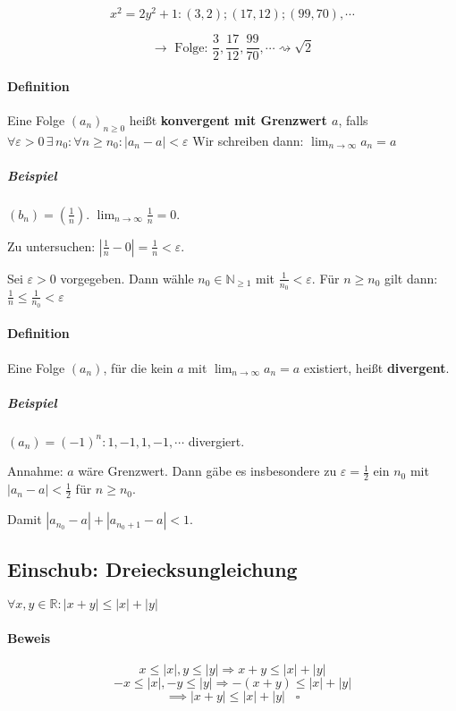\documentclass[14pt,a4paper]{article}
\newcommand{\N}{\ensuremath{\mathbb{N}}}
\begin{document}
    $$ x^2 = 2y^2 + 1 : (3,2); (17,12); (99,70), \dotsb $$

    $$ \rightarrow \text{ Folge: } \frac{3}{2}, \frac{17}{12}, \frac{99}{70},
    \dotsb \rightsquigarrow \sqrt{2} $$

    \paragraph{Definition}
    Eine Folge $(a_n)_{n \geq 0} $ heißt \textbf{konvergent mit Grenzwert $a$},
    falls $ \forall \varepsilon > 0 \,\exists\, n_0 : \forall n \geq n_0 : | a_n
    - a | < \varepsilon $
    Wir schreiben dann: $ \lim_{n \to \infty} a_n = a $

    \subparagraph{Beispiel}
    $ (b_n) = (\frac{1}{n}) $.
    $ \lim_{n \to \infty} \frac{1}{n} = 0 $.

    Zu untersuchen: $ | \frac{1}{n} - 0 | = \frac{1}{n} < \varepsilon $.

    Sei $\varepsilon > 0$ vorgegeben. Dann wähle $ n_0 \in \N_{\geq 1} $ mit
    $\frac{1}{n_0} < \varepsilon $. Für $n \geq n_0 $ gilt dann: $ \frac{1}{n}
    \leq \frac{1}{n_0} <  \varepsilon $

    \paragraph{Definition}
    Eine Folge $(a_n)$, für die kein $a$ mit $\lim_{n \to \infty} a_n = a$
    existiert, heißt \textbf{divergent}.

    \subparagraph{Beispiel}
    $ (a_n) = (-1)^{n} : 1, -1, 1, -1, \dotsb $ divergiert.

    Annahme: $a$ wäre Grenzwert. Dann gäbe es insbesondere zu $ \varepsilon =
    \frac{1}{2} $ ein $n_0$ mit $ |a_n - a| < \frac{1}{2} $ für $ n \geq n_0$.

    Damit $ | a_{n_0} - a | + | a_{n_0 + 1} - a | < 1 $.

    \subsection{Einschub: Dreiecksungleichung}
    $ \forall x,y \in \mathbb{R} : |x+y| \leq |x| + |y| $

    \paragraph{Beweis}
    $$  x \leq |x| ,  y \leq |y| \Rightarrow   x+y  \leq |x| + |y| $$
    $$ -x \leq |x| , -y \leq |y| \Rightarrow -(x+y) \leq |x| + |y| $$
    $$ \implies |x+y| \leq |x| + |y| \;\;\;\square $$
\end{document}
